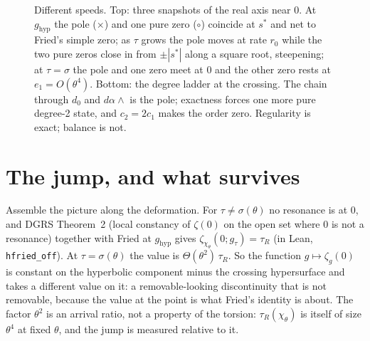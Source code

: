 \documentclass[11pt]{article}
\begin{document}
\begin{figure}[h]
\caption{Different speeds. Top: three snapshots of the real axis near $0$. At $g_{\mathrm{hyp}}$
the pole ($\times$) and one pure zero ($\circ$) coincide at $s^*$ and net to Fried's simple zero;
as $\tau$ grows the pole moves at rate $r_0$ while the two pure zeros close in from $\pm|s^*|$
along a square root, steepening; at $\tau = \sigma$ the pole and one zero meet at $0$ and the
other zero rests at $e_1 = O(\theta^4)$. Bottom: the degree ladder at the crossing. The chain
through $d_0$ and $d\alpha\wedge$ is the pole; exactness forces one more pure degree-2 state, and
$c_2 = 2c_1$ makes the order zero. Regularity is exact; balance is not.}
\end{figure}

\section{The jump, and what survives}

Assemble the picture along the deformation. For $\tau \neq \sigma(\theta)$ no resonance is at
$0$, and DGRS Theorem~2 (local constancy of $\zeta(0)$ on the open set where $0$ is not a
resonance) together with Fried at $g_{\mathrm{hyp}}$ gives $\zeta_{\chi_\theta}(0; g_\tau) = \tau_R$
(in Lean, \texttt{hfried\_off}). At $\tau = \sigma(\theta)$ the value is $\Theta(\theta^2)\,\tau_R$.
So the function $g \mapsto \zeta_g(0)$ is constant on the hyperbolic component minus the crossing
hypersurface and takes a different value on it: a removable-looking discontinuity that is not
removable, because the value at the point is what Fried's identity is about. The factor
$\theta^2$ is an arrival ratio, not a property of the torsion: $\tau_R(\chi_\theta)$ is itself of
size $\theta^4$ at fixed $\theta$, and the jump is measured relative to it.
\end{document}
